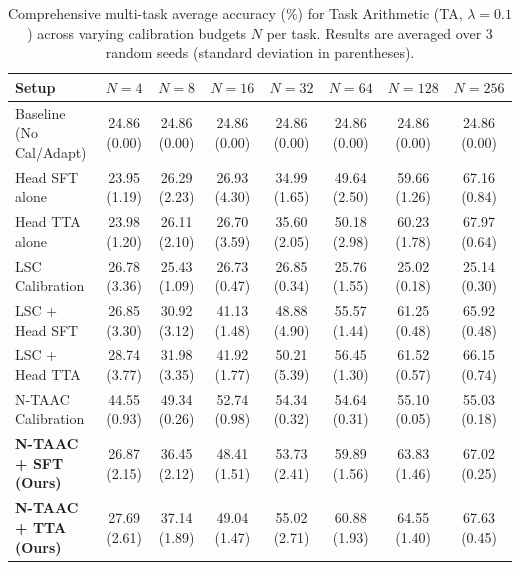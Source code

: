 \documentclass{article}
\theoremstyle{plain}
\theoremstyle{definition}
\theoremstyle{remark}
\begin{document}
\begin{table}[ht]
\centering
\caption{Comprehensive multi-task average accuracy (\%) for Task Arithmetic (TA, $\lambda=0.1$) across varying calibration budgets $N$ per task. Results are averaged over 3 random seeds (standard deviation in parentheses).}
\label{tab:appendix_ta_01}
\vskip 0.15in
\begin{sc}
\begin{scriptsize}
\setlength{\tabcolsep}{3pt}
\begin{tabular}{lccccccc}
\toprule
Setup & $N=4$ & $N=8$ & $N=16$ & $N=32$ & $N=64$ & $N=128$ & $N=256$ \\
\midrule
Baseline (No Cal/Adapt) & 24.86 (0.00) & 24.86 (0.00) & 24.86 (0.00) & 24.86 (0.00) & 24.86 (0.00) & 24.86 (0.00) & 24.86 (0.00) \\
Head SFT alone & 23.95 (1.19) & 26.29 (2.23) & 26.93 (4.30) & 34.99 (1.65) & 49.64 (2.50) & 59.66 (1.26) & 67.16 (0.84) \\
Head TTA alone & 23.98 (1.20) & 26.11 (2.10) & 26.70 (3.59) & 35.60 (2.05) & 50.18 (2.98) & 60.23 (1.78) & 67.97 (0.64) \\
LSC Calibration & 26.78 (3.36) & 25.43 (1.09) & 26.73 (0.47) & 26.85 (0.34) & 25.76 (1.55) & 25.02 (0.18) & 25.14 (0.30) \\
LSC + Head SFT & 26.85 (3.30) & 30.92 (3.12) & 41.13 (1.48) & 48.88 (4.90) & 55.57 (1.44) & 61.25 (0.48) & 65.92 (0.48) \\
LSC + Head TTA & 28.74 (3.77) & 31.98 (3.35) & 41.92 (1.77) & 50.21 (5.39) & 56.45 (1.30) & 61.52 (0.57) & 66.15 (0.74) \\
N-TAAC Calibration & 44.55 (0.93) & 49.34 (0.26) & 52.74 (0.98) & 54.34 (0.32) & 54.64 (0.31) & 55.10 (0.05) & 55.03 (0.18) \\
\textbf{N-TAAC + SFT (Ours)} & 26.87 (2.15) & 36.45 (2.12) & 48.41 (1.51) & 53.73 (2.41) & 59.89 (1.56) & 63.83 (1.46) & 67.02 (0.25) \\
\textbf{N-TAAC + TTA (Ours)} & 27.69 (2.61) & 37.14 (1.89) & 49.04 (1.47) & 55.02 (2.71) & 60.88 (1.93) & 64.55 (1.40) & 67.63 (0.45) \\
\bottomrule
\end{tabular}
\end{scriptsize}
\end{sc}
\end{table}
\end{document}
